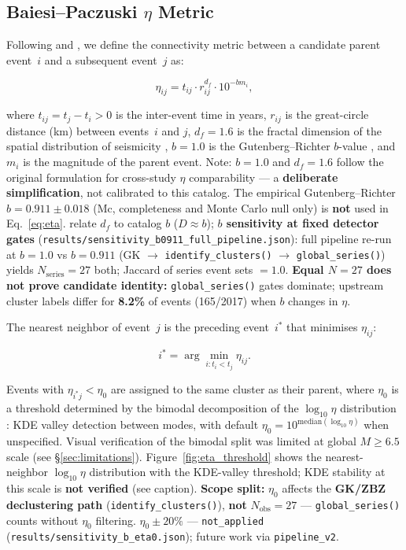 \documentclass[draft]{agujournal2019}
\begin{document}
\subsection{Baiesi--Paczuski $\eta$ Metric}

Following \citet{Baiesi2004} and \citet{ZaliapinBenZion2008}, we define
the connectivity metric between a candidate parent event~$i$ and a
subsequent event~$j$ as:

\begin{equation}
  \eta_{ij} = t_{ij} \cdot r_{ij}^{d_f} \cdot 10^{-b m_i},
  \label{eq:eta}
\end{equation}

\noindent where $t_{ij} = t_j - t_i > 0$ is the inter-event time in years,
$r_{ij}$ is the great-circle distance (km) between events~$i$ and $j$,
$d_f = 1.6$ is the fractal dimension of the spatial distribution of
seismicity \citep{Kagan1991}, $b = 1.0$ is the Gutenberg--Richter
$b$-value \citep{GutenbergRichter1956}, and $m_i$ is the magnitude
of the parent event.
Note: $b = 1.0$ and $d_f = 1.6$ follow the original \citet{Baiesi2004} formulation for
cross-study $\eta$ comparability --- a \textbf{deliberate simplification}, not calibrated
to this catalog.
The empirical Gutenberg--Richter $b = 0.911 \pm 0.018$ (Mc, completeness and Monte Carlo
null only) is \textbf{not} used in Eq.~\eqref{eq:eta}.
\citet{ZaliapinBenZion2008,ZaliapinBenZion2013} relate $d_f$ to catalog $b$ ($D \approx b$);
\textbf{$b$ sensitivity at fixed detector gates}
(\texttt{results/sensitivity\_b0911\_full\_pipeline.json}):
full pipeline re-run at $b=1.0$ vs $b=0.911$ (GK $\to$
\texttt{identify\_clusters()} $\to$ \texttt{global\_series()}) yields
$N_\mathrm{series}=27$ both; Jaccard of series event sets $=1.0$.
\textbf{Equal $N=27$ does not prove candidate identity:}
\texttt{global\_series()} gates dominate; upstream cluster labels differ for
\textbf{8.2\%} of events (165/2017) when $b$ changes in $\eta$.

The nearest neighbor of event~$j$ is the preceding event~$i^*$ that
minimises $\eta_{ij}$:

\begin{equation}
  i^* = \arg\min_{i: t_i < t_j} \eta_{ij}.
\end{equation}

Events with $\eta_{i^*j} < \eta_0$ are assigned to the same cluster
as their parent, where $\eta_0$ is a threshold determined by the
bimodal decomposition of the $\log_{10} \eta$ distribution
\citep{ZaliapinBenZion2013}: KDE valley detection between modes, with
default $\eta_0 = 10^{\mathrm{median}(\log_{10}\eta)}$ when unspecified.
Visual verification of the bimodal split was limited at global $M \ge 6.5$
scale (see \S\ref{sec:limitations}).
Figure~\ref{fig:eta_threshold} shows the nearest-neighbor $\log_{10}\eta$
distribution with the KDE-valley threshold; KDE stability at this scale is
\textbf{not verified} (see caption).
\textbf{Scope split:} $\eta_0$ affects the \textbf{GK/ZBZ declustering path}
(\texttt{identify\_clusters()}), \textbf{not} $N_\mathrm{obs}=27$ ---
\texttt{global\_series()} counts without $\eta_0$ filtering.
$\eta_0 \pm 20\%$ --- \texttt{not\_applied}
(\texttt{results/sensitivity\_b\_eta0.json}); future work via \texttt{pipeline\_v2}.
\end{document}
